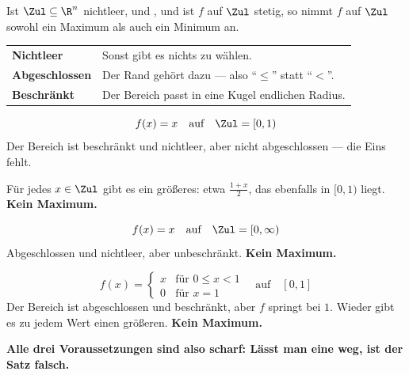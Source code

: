 \begin{merksatz}
Ist $\Zul \subseteq \R^n$ nichtleer,  und , und ist $f$ auf $\Zul$ stetig, so nimmt $f$ auf $\Zul$ sowohl ein Maximum als auch ein Minimum an.

\begin{center}
{\small
\renewcommand{\arraystretch}{1.5}
\begin{tabular}{@{}P{2.4cm}P{6.2cm}@{}}
\toprule
\textbf{Nichtleer} & Sonst gibt es nichts zu wählen.\\
\textbf{Abgeschlossen} & Der Rand gehört dazu --- also \enquote{$\le$} statt \enquote{$<$}.\\
\textbf{Beschränkt} & Der Bereich passt in eine Kugel endlichen Radius.\\
\bottomrule
\end{tabular}}
\end{center}

\begin{center}
\begin{minipage}{0.88\textwidth}
\end{minipage}
\end{center}
\end{merksatz}

\begin{warnung}
\[ f(x) = x \quad\text{auf}\quad \Zul = [0,1) \]
Der Bereich ist beschränkt und nichtleer, aber nicht abgeschlossen --- die Eins fehlt.

Für jedes $x \in \Zul$ gibt es ein größeres: etwa $\frac{1+x}{2}$, das ebenfalls in $[0,1)$ liegt. \textbf{Kein Maximum.}

\[ f(x) = x \quad\text{auf}\quad \Zul = [0,\infty) \]
Abgeschlossen und nichtleer, aber unbeschränkt. \textbf{Kein Maximum.}

\[ f(x) = \begin{cases} x & \text{für } 0 \le x < 1\\ 0 & \text{für } x = 1\end{cases} \quad\text{auf}\quad [0,1] \]
Der Bereich ist abgeschlossen und beschränkt, aber $f$ springt bei $1$. Wieder gibt es zu jedem Wert einen größeren. \textbf{Kein Maximum.}

\begin{center}
\begin{minipage}{0.9\textwidth}
\textbf{Alle drei Voraussetzungen sind also scharf: Lässt man eine weg, ist der Satz falsch.}
\end{minipage}
\end{center}
\end{warnung}

